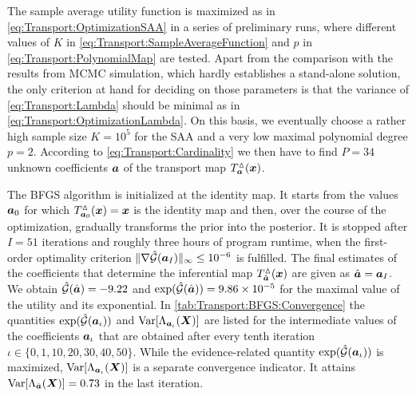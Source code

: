 The sample average utility function is maximized as in \cref{eq:Transport:OptimizationSAA} in a series of preliminary runs,
where different values of \(K\) in \cref{eq:Transport:SampleAverageFunction} and \(p\) in \cref{eq:Transport:PolynomialMap} are tested.
Apart from the comparison with the results from MCMC simulation, which hardly establishes a stand-alone solution,
the only criterion at hand for deciding on those parameters is that the variance of \cref{eq:Transport:Lambda} should be minimal as in \cref{eq:Transport:OptimizationLambda}.
On this basis, we eventually choose a rather high sample size \(K = 10^5\) for the SAA and a very low maximal polynomial degree \(p = 2\).
According to \cref{eq:Transport:Cardinality} we then have to find \(P = 34\) unknown coefficients \(\bm{a}\) of the transport map \(T_{\bm{a}}^\vartriangle(\bm{x})\).
\par %
The BFGS algorithm is initialized at the identity map.
It starts from the values \(\bm{a}_0\) for which \(T_{\bm{a}_0}^\vartriangle(\bm{x}) = \bm{x}\) is the identity map and then,
over the course of the optimization, gradually transforms the prior into the posterior.
It is stopped after \(I = 51\) iterations and roughly three hours of program runtime,
when the first-order optimality criterion \(\lVert \nabla \hat{\mathcal{G}}(\bm{a}_I) \rVert_\infty \leq 10^{-6}\) is fulfilled.
The final estimates of the coefficients that determine the inferential map \(T_{\hat{\bm{a}}}^\vartriangle(\bm{x})\) are given as \(\hat{\bm{a}} = \bm{a}_I\).
We obtain \(\hat{\mathcal{G}}(\hat{\bm{a}}) = -9.22\) and \(\exp(\hat{\mathcal{G}}(\hat{\bm{a}})) = 9.86 \times 10^{-5}\) for the maximal value of the utility and its exponential.
In \cref{tab:Transport:BFGS:Convergence} the quantities \(\exp(\hat{\mathcal{G}}(\bm{a}_\iota))\) and \(\mathrm{Var}[\Lambda_{\bm{a}_\iota}(\bm{X})]\)
are listed for the intermediate values of the coefficients \(\bm{a}_\iota\) that are obtained after every tenth iteration \(\iota \in \{0,1,10,20,30,40,50\}\).
While the evidence-related quantity \(\exp(\hat{\mathcal{G}}(\bm{a}_\iota))\) is maximized, \(\mathrm{Var}[\Lambda_{\bm{a}_\iota}(\bm{X})]\) is a separate convergence indicator.
It attains \(\mathrm{Var}[\Lambda_{\hat{\bm{a}}}(\bm{X})] = 0.73\) in the last iteration.
